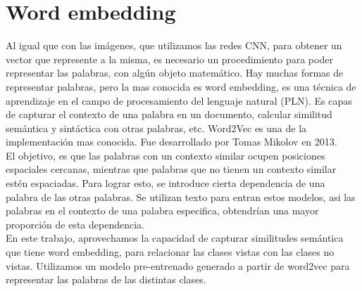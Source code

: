 \section{Word embedding}
Al igual que con las imágenes, que utilizamos las redes CNN, para obtener un vector que represente a la misma, es necesario un procedimiento para poder representar las palabras, con algún objeto matemático. Hay muchas formas de representar palabras, pero la mas conocida es word embedding, es una técnica de aprendizaje en el campo de procesamiento del lenguaje natural (PLN). Es capas de capturar el contexto de una palabra en un documento, calcular similitud semántica y sintáctica con otras palabras, etc. Word2Vec \cite{mikolov2013distributed} es una de la implementación mas conocida. Fue desarrollado por Tomas Mikolov en 2013. \\
El objetivo, es que las palabras con un contexto similar ocupen posiciones espaciales cercanas, mientras que palabras que no tienen un contexto similar estén espaciadas. Para lograr esto, se introduce cierta dependencia de una palabra de las otras palabras. Se utilizan texto para entran estos modelos, asi las palabras en el contexto de una palabra especifica, obtendrían una mayor proporción de esta dependencia.\\
En este trabajo, aprovechamos la capacidad de capturar similitudes semántica que tiene word embedding, para relacionar las clases vistas con las clases no vistas. Utilizamos un modelo pre-entrenado generado a partir de word2vec para representar las palabras de las distintas clases.

